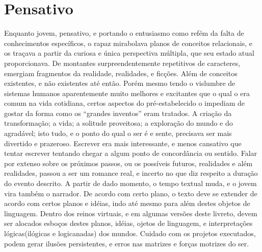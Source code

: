 \documentclass[a4paper,11pt]{book}
\begin{document}
\section{Pensativo}
Enquanto jovem, pensativo, e portando o entusiasmo como refém da falta de conhecimentos específicos, o rapaz mirabolava planos de conceitos relacionais, e os traçava a partir da curiosa e única perspectiva múltipla, que seu estado atual proporcionava.
	De montantes surpreendentemente repetitivos de caracteres, emergiam fragmentos da realidade, realidades, e ficções. Além de conceitos existentes, e não existentes até então.
	Porém mesmo tendo o vislumbre de sistemas humanos aparentemente muito melhores e excitantes que o qual o era comum na vida cotidiana, certos aspectos do pré-estabelecido o impediam de gostar da forma como os “grandes inventos” eram tratados. A criação da transformação; a vida; a solitude proveitosa; a exploração do mundo e do agradável; isto tudo, e o ponto do qual o ser é e sente, precisava ser mais divertido e prazeroso. Escrever era mais interessante, e menos cansativo que tentar escrever tentando chegar a algum ponto de concordância ou sentido.
	Falar por extenso sobre os próximos passos, ou os possíveis futuros, realidades e além realidades, passou a ser um romance real, e incerto no que diz respeito a duração do evento descrito.
	A partir de dado momento, o tempo textual muda, e o jovem vira também o narrador. De acordo com certo plano, o texto deve se extender de acordo com certos planos e idéias, indo até mesmo para além destes objetos de linguagem.
	Dentro dos reinos virtuais, e em algumas versões deste livreto, devem ser alocados esboços destes planos, idéias, ojetos de linguagem, e interpretações lógicas(ilógicas e logicanadas) dos mundos. Cuidado com os projetos executados, podem gerar ilusões persistentes, e erros nas matrizes e forças motrizes do ser.
	\linebreak
\end{document}
